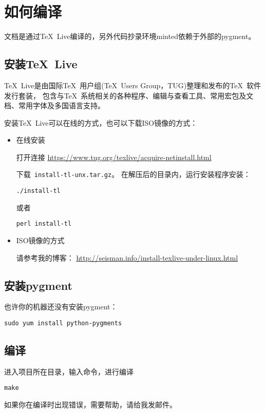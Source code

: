 \section{如何编译}
文档是通过\TeX~Live编译的，另外代码抄录环境minted依赖于外部的pygment。
\subsection{安装\TeX~Live}
\TeX~Live是由国际\TeX~用户组(\TeX~Users Group，TUG)整理和发布的\TeX~软件发行套装，
包含与\TeX~系统相关的各种程序、编辑与查看工具、常用宏包及文档、常用字体及多国语言支持。

安装\TeX~Live可以在线的方式，也可以下载ISO镜像的方式：
\begin{itemize}
\item 在线安装

打开连接
\url{https://www.tug.org/texlive/acquire-netinstall.html}

下载~\verb+install-tl-unx.tar.gz+。
在解压后的目录内，运行安装程序安装：
\begin{verbatim}
./install-tl
\end{verbatim}
或者
\begin{verbatim}
perl install-tl
\end{verbatim}
\item ISO镜像的方式

请参考我的博客：
\url{http://seisman.info/install-texlive-under-linux.html}
\end{itemize}
\subsection{安装pygment}
也许你的机器还没有安装pygment：
\begin{verbatim}
sudo yum install python-pygments
\end{verbatim}
\subsection{编译}
进入项目所在目录，输入命令，进行编译
\begin{verbatim}
make
\end{verbatim}
如果你在编译时出现错误，需要帮助，请给我发邮件。
